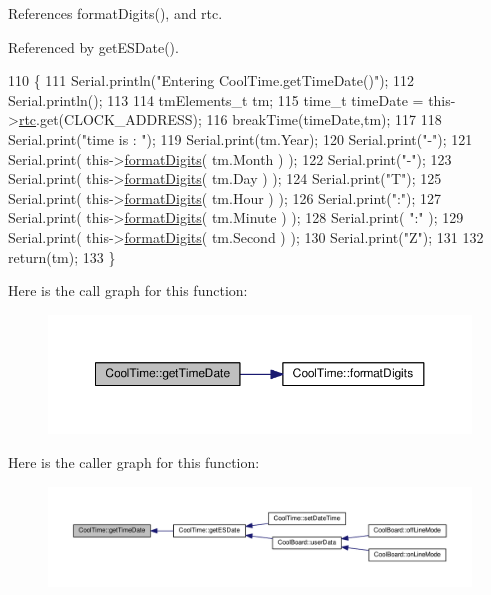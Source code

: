 References format\+Digits(), and rtc.



Referenced by get\+E\+S\+Date().


\begin{DoxyCode}
110 \{   
111     Serial.println(\textcolor{stringliteral}{"Entering CoolTime.getTimeDate()"});
112     Serial.println();
113 
114     tmElements\_t tm;
115     time\_t timeDate = this->\hyperlink{classCoolTime_abd38f2384ff90692b1568d9db869412e}{rtc}.get(CLOCK\_ADDRESS);
116     breakTime(timeDate,tm);
117     
118     Serial.print(\textcolor{stringliteral}{"time is : "});
119     Serial.print(tm.Year);
120     Serial.print(\textcolor{stringliteral}{"-"});
121     Serial.print( this->\hyperlink{classCoolTime_acd537cd4210d7bde4e1f5c47d2ac0456}{formatDigits}( tm.Month ) );
122     Serial.print(\textcolor{stringliteral}{"-"});
123     Serial.print( this->\hyperlink{classCoolTime_acd537cd4210d7bde4e1f5c47d2ac0456}{formatDigits}( tm.Day ) );
124     Serial.print(\textcolor{stringliteral}{"T"});
125     Serial.print( this->\hyperlink{classCoolTime_acd537cd4210d7bde4e1f5c47d2ac0456}{formatDigits}( tm.Hour ) );
126     Serial.print(\textcolor{stringliteral}{":"});
127     Serial.print( this->\hyperlink{classCoolTime_acd537cd4210d7bde4e1f5c47d2ac0456}{formatDigits}( tm.Minute ) );
128     Serial.print( \textcolor{stringliteral}{":"} );
129     Serial.print( this->\hyperlink{classCoolTime_acd537cd4210d7bde4e1f5c47d2ac0456}{formatDigits}( tm.Second ) );
130     Serial.print(\textcolor{stringliteral}{"Z"});
131     
132     \textcolor{keywordflow}{return}(tm);
133 \}
\end{DoxyCode}
Here is the call graph for this function\+:
\nopagebreak
\begin{figure}[H]
\begin{center}
\leavevmode
\includegraphics[width=350pt]{classCoolTime_a7a7501c5ca77dd1248bea704c44f986c_cgraph}
\end{center}
\end{figure}
Here is the caller graph for this function\+:
\nopagebreak
\begin{figure}[H]
\begin{center}
\leavevmode
\includegraphics[width=350pt]{classCoolTime_a7a7501c5ca77dd1248bea704c44f986c_icgraph}
\end{center}
\end{figure}
\mbox{\label{classCoolTime_a5ae038a4498602b189f76a10bf02adf8}} 
